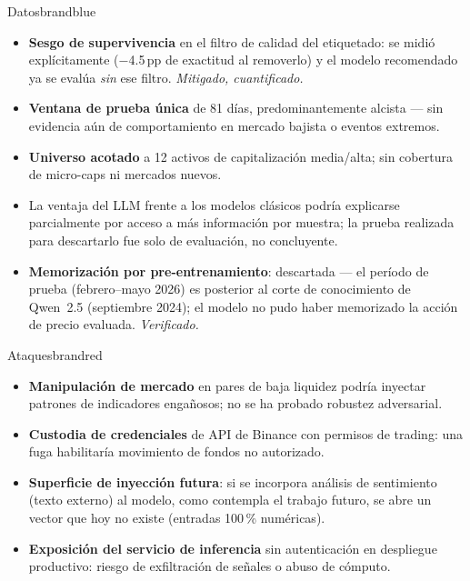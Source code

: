 \documentclass[11pt]{article}
\begin{document}
\vspace{0.4em}
\noindent
\begin{minipage}{0.485\linewidth}
\begin{riskpanel}{Datos}{brandblue}
\begin{itemize}
\item \textbf{Sesgo de supervivencia} en el filtro de calidad del etiquetado: se midi\'o expl\'icitamente ($-$4.5\,pp de exactitud al removerlo) y el modelo recomendado ya se eval\'ua \emph{sin} ese filtro. \textit{Mitigado, cuantificado.}
\item \textbf{Ventana de prueba \'unica} de 81 d\'ias, predominantemente alcista --- sin evidencia a\'un de comportamiento en mercado bajista o eventos extremos.
\item \textbf{Universo acotado} a 12 activos de capitalizaci\'on media/alta; sin cobertura de micro-caps ni mercados nuevos.
\item La ventaja del LLM frente a los modelos cl\'asicos podr\'ia explicarse parcialmente por acceso a m\'as informaci\'on por muestra; la prueba realizada para descartarlo fue solo de evaluaci\'on, no concluyente.
\item \textbf{Memorizaci\'on por pre-entrenamiento}: descartada --- el per\'iodo de prueba (febrero--mayo 2026) es posterior al corte de conocimiento de Qwen~2.5 (septiembre 2024); el modelo no pudo haber memorizado la acci\'on de precio evaluada. \textit{Verificado.}
\end{itemize}
\end{riskpanel}
\end{minipage}\hfill
\begin{minipage}{0.485\linewidth}
\begin{riskpanel}{Ataques}{brandred}
\begin{itemize}
\item \textbf{Manipulaci\'on de mercado} en pares de baja liquidez podr\'ia inyectar patrones de indicadores enga\~nosos; no se ha probado robustez adversarial.
\item \textbf{Custodia de credenciales} de API de Binance con permisos de trading: una fuga habilitar\'ia movimiento de fondos no autorizado.
\item \textbf{Superficie de inyecci\'on futura}: si se incorpora an\'alisis de sentimiento (texto externo) al modelo, como contempla el trabajo futuro, se abre un vector que hoy no existe (entradas 100\,\% num\'ericas).
\item \textbf{Exposici\'on del servicio de inferencia} sin autenticaci\'on en despliegue productivo: riesgo de exfiltraci\'on de se\~nales o abuso de c\'omputo.
\end{itemize}
\end{riskpanel}
\end{minipage}
\end{document}
